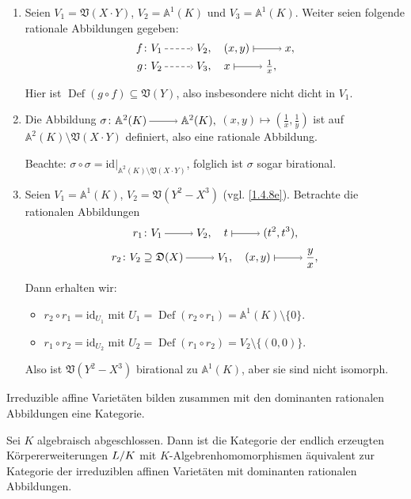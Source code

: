 \documentclass[a4paper,12pt,index=toc]{scrbook}
\theoremstyle{keinenummern} %
\def\A{\mathbb{A}}
\def\V{\mathfrak{V}}
\newcommand{\D}{\mathfrak{D}}
\newcommand{\id}{\mathrm{id}}
\newcommand{\Def}{\operatorname{Def}}
\newcommand{\restrict}[1]{|_{#1}}
\begin{document}
\begin{bsp}\label{1.6.6}
  \begin{enumerate}
  \item{} Seien $V_1=\V(X\cdot Y)$, $V_2=\A^1(K)$ und $V_3=\A^1(K)$. Weiter seien folgende rationale Abbildungen gegeben:
  \begin{align*}f\colon&V_1\ppf V_2, \quad (x,y)\mapsto x,\\
  g\colon&V_2\ppf V_3, \quad x\mapsto \tfrac{1}{x},\end{align*}

  Hier ist $\Def(g\circ f)\subseteq \V(Y)$, also insbesondere nicht dicht in $V_1$.
  \item{} Die Abbildung $\sigma \colon \A^2(K)\ra \A^2(K),$  $(x,y)\mapsto (\frac{1}{x},\frac{1}{y})$ ist auf $\A^2(K)\setminus \V(X\cdot Y)$ definiert, also eine rationale Abbildung.

  Beachte: $\sigma\circ \sigma=\id{\restrict{\A^2(K)\setminus\V(X\cdot Y)}}$, folglich ist $\sigma$ sogar birational.

  \item\label{1.6.6c} Seien $V_1=\A^1(K)$, $V_2=\V(Y^2-X^3)$ (vgl. \cref{1.4.8e}). Betrachte die rationalen Abbildungen 
  \[r_1 \colon V_1\ra V_2, \quad t\mapsto (t^2,t^3),\]
  \[r_2 \colon V_2\supseteq \D(X)\ra V_1, \quad (x,y)\mapsto \frac{y}{x},\]

  Dann erhalten wir:\begin{itemize}
     \item $r_2\circ r_1=\id_{U_1}$ mit $U_1=\Def(r_2\circ r_1)=\A^1(K)\setminus \{0\}$.
     \item $r_1\circ r_2=\id_{U_2}$ mit $U_2=\Def(r_1\circ r_2)=V_2\setminus \{(0,0)\}$.
     \end{itemize}
  Also ist $\V(Y^2-X^3)$ birational zu $\A^1(K)$, aber sie sind nicht isomorph.
  \end{enumerate}
\end{bsp}  

\begin{nbem}
Irreduzible affine Varietäten bilden zusammen mit den dominanten rationalen Abbildungen  eine Kategorie.
\end{nbem}
 
\begin{satz}\label{satz4} Sei $K$ algebraisch abgeschlossen. Dann ist die Kategorie der endlich erzeugten Körper\-erweiterungen $\Quotient{L}{K}$ mit $K$-Algebrenhomomorphismen äquivalent zur Kategorie der irreduziblen affinen Varietäten mit dominanten rationalen Abbildungen.
\end{satz}
\end{document}
